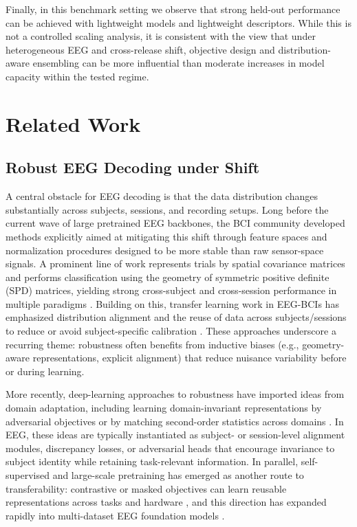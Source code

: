 \documentclass[12pt]{article}
\begin{document}
Finally, in this benchmark setting we observe that strong held-out performance can be achieved with lightweight models and lightweight descriptors. While this is not a controlled scaling analysis, it is consistent with the view that under heterogeneous EEG and cross-release shift, objective design and distribution-aware ensembling can be more influential than moderate increases in model capacity within the tested regime.

\section{Related Work}

\subsection{Robust EEG Decoding under Shift}
A central obstacle for EEG decoding is that the data distribution changes substantially across subjects, sessions, and
recording setups. Long before the current wave of large pretrained EEG backbones, the BCI community developed methods
explicitly aimed at mitigating this shift through feature spaces and normalization procedures designed to be more stable
than raw sensor-space signals. A prominent line of work represents trials by spatial covariance matrices and performs
classification using the geometry of symmetric positive definite (SPD) matrices, yielding strong cross-subject and
cross-session performance in multiple paradigms \citep{Barachant2012RiemannianBCI}. Building on this, transfer learning
work in EEG-BCIs has emphasized distribution alignment and the reuse of data across subjects/sessions to reduce or avoid
subject-specific calibration \citep{Jayaram2016TransferLearningBCI,Zanini2018RiemannianTL,HeWu2020EuclideanAlignment}.
These approaches underscore a recurring theme: robustness often benefits from inductive biases (e.g., geometry-aware
representations, explicit alignment) that reduce nuisance variability before or during learning.

More recently, deep-learning approaches to robustness have imported ideas from domain adaptation, including learning
domain-invariant representations by adversarial objectives \citep{Ganin2016DANN} or by matching second-order statistics
across domains \citep{SunSaenko2016DeepCORAL}. In EEG, these ideas are typically instantiated as subject- or session-level
alignment modules, discrepancy losses, or adversarial heads that encourage invariance to subject identity while retaining
task-relevant information. In parallel, self-supervised and large-scale pretraining has emerged as another route to transferability: contrastive or masked objectives can learn reusable representations across tasks and hardware
\citep{Kostas2021BENDR}, and this direction has expanded rapidly into multi-dataset EEG foundation models
\citep{wang2024eegpt,Jiang2024LaBraM,Chen2024EEGFormer,Wang2025EEGMamba,ElOuahidi2025REVE,Yue2024BrainGPT}.
\end{document}
